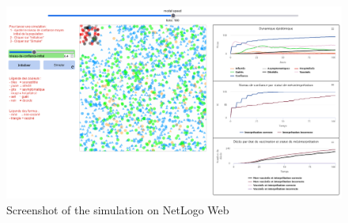 \newpage

\begin{figure}[!htb]
    \centering
    \minipage{\textwidth}
        \includegraphics[width=1.4\linewidth, angle=90, origin=c]{pics/simulation_screenshot.png}
    \endminipage
    \caption{Screenshot of the simulation on NetLogo Web}
    \label{fig:simulation_screenshot}
\end{figure}

\newpage
